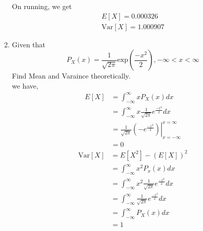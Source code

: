 \documentclass[journal,12pt,twocolumn]{IEEEtran}
\renewcommand\thesection{\arabic{section}}
\begin{document}
\begin{enumerate}[label=\thesection.\arabic*.,ref=\thesection.\theenumi]
On running, we get
    \begin{align}
        E[X] = 0.000326 \\
        \text{Var}[X] = 1.000907
    \end{align}


    \item Given that
     \begin{equation}
        P_X(x) = \frac{1}{\sqrt{2\pi}}\text{exp}\left(\frac{-x^2}{2}\right), -\infty < x < \infty
     \end{equation}
     Find Mean and Varaince theoretically.\\
     \solution we have,
     \begin{align}
        E[X] &= \int_{-\infty}^{\infty}xP_X(x)dx \\
        &= \int_{-\infty}^{\infty}x\frac{1}{\sqrt{2\pi}}e^{\frac{-x^2}{2}}dx \\
        &=\left. \frac{1}{\sqrt{2\pi}}(-e^{\frac{-x^2}{2}}) \right|_{x=-\infty}^{x=\infty}\\
        &=0
     \end{align}
     \begin{align}
        \text{Var}[X]&=E[X^2]-(E[X])^2 \\
        &=\int_{-\infty}^{\infty}x^2P_x(x)dx \\
        &=\int_{-\infty}^{\infty}x^2\frac{1}{\sqrt{2\pi}}e^{\frac{-x^2}{2}}dx \\
        &=\int_{-\infty}^{\infty}\frac{1}{\sqrt{2\pi}}e^{\frac{-x^2}{2}}dx\\
        &=\int_{-\infty}^{\infty}P_X(x)dx\\
        &=1
     \end{align}
\end{enumerate}
\end{document}
